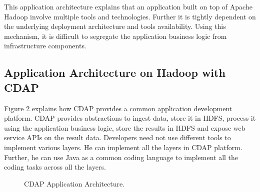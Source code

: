 \documentclass[9pt,twocolumn,twoside]{../../styles/osajnl}
\begin{document}
This application architecture explains that an application built on top
 of Apache Hadoop involve multiple tools and technologies. Further it is
 tightly dependent on the underlying deployment architecture and tools
 availability. Using this mechanism, it is difficult to segregate the
 application business logic from infrastructure components.

\subsection{Application Architecture on Hadoop with CDAP}
Figure 2 \cite{www-cdap-architecture} explains how CDAP provides a common
application development platform. CDAP provides abstractions to ingest data,
store it in HDFS, process it using the application business logic, store the
results in HDFS and expose web service APIs on the result data. Developers need
 not use different tools to implement various layers. He can implement
  all the layers in CDAP platform. Further, he can use Java as a common coding
 language to implement all the coding tasks across all the layers.

\begin{figure}[htbp]
\centering
{}
\caption{CDAP Application Architecture.}
\label{fig:CDAP Architecture}
\end{figure}
\end{document}
